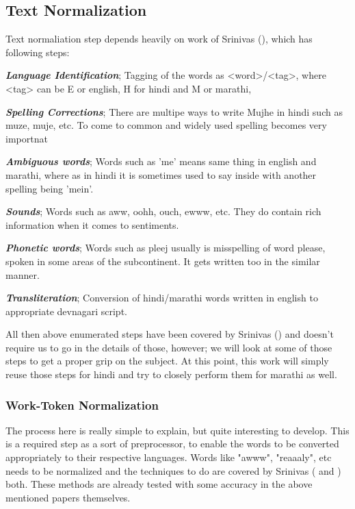 \documentclass[conference]{IEEEtran}
\begin{document}
\subsection{Text Normalization}
Text normaliation step depends heavily on work of Srinivas
(\cite{sharma_text_2015}), which has following steps:
\begin{itemize*}
  \item \textbf{\textit{Language Identification}}; Tagging of the words as
      <word>/<tag>, where <tag> can be E or english, H for hindi and M or
      marathi,\\
  \item \textbf{\textit{Spelling Corrections}}; There are multipe ways to write
      Mujhe in hindi such as muze, muje, etc. To come to common and widely used
      spelling becomes very importnat\\
  \item \textbf{\textit{Ambiguous words}}; Words such as 'me' means same thing
      in english and marathi, where as in hindi it is sometimes used to say
      inside with another spelling being 'mein'. \\
  \item \textbf{\textit{Sounds}}; Words such as aww, oohh, ouch, ewww, etc.
      They do contain rich information when it comes to sentiments.\\
  \item \textbf{\textit{Phonetic words}}; Words such as pleej usually is
      misspelling of word please, spoken in some areas of the subcontinent. It
      gets written too in the similar manner.\\
  \item \textbf{\textit{Transliteration}}; Conversion of hindi/marathi words
      written in english to appropriate devnagari script.\\
\end{itemize*}

All then above enumerated steps have been covered by Srinivas
(\cite{sharma_text_2015}) and doesn't require us to go in the details of those,
however; we will look at some of those steps to get a proper grip on the
subject. At this point, this work will simply reuse those steps for hindi and try to
closely perform them for marathi as well. 

\subsubsection{Work-Token Normalization}
The process here is really simple to explain, but quite interesting to develop.
This is a required step as a sort of preprocessor, to enable the words to be
converted appropriately to their respective languages. Words like "awww",
"reaaaly", etc needs to be normalized and the techniques to do are covered by
Srinivas (\cite{sharma_text_2015} and \cite{shashank_sharma_sentiment_????}
) both. These methods are already tested with some accuracy in the above
mentioned papers themselves.  
\end{document}
